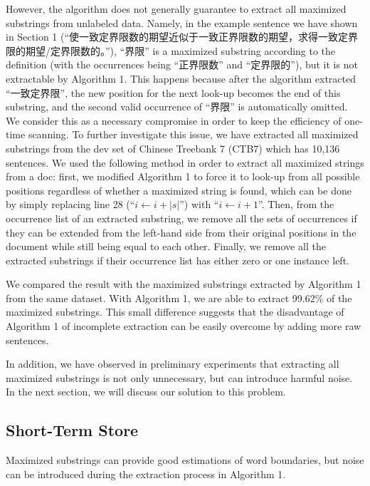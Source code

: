 \documentclass[english]{jnlp_1.4}
\begin{document}
However, the algorithm does not generally guarantee to extract all maximized substrings from unlabeled data. Namely, in the example sentence we have shown in Section 1 (``使一致定界限数的期望近似于一致正界限数的期望，求得一致定界限的期望/定界限数的。''), \mbox{``界}限'' is a maximized substring according to the definition (with the occurrences being ``正界限数'' and ``定界限的''), but it is not extractable by Algorithm 1. This happens because after the algorithm extracted ``一致定界限'', the new position for the next look-up becomes the end of this substring, and the second valid occurrence of ``界限'' is automatically omitted. We consider this as a necessary compromise in order to keep the efficiency of one-time scanning. To further investigate this issue, we have extracted all maximized substrings from the dev set of Chinese Treebank 7 (CTB7) which has 10,136 sentences. We used the following method in order to extract all maximized strings from a doc: first, we modified Algorithm 1 to force it to look-up from all possible positions regardless of whether a maximized string is found, which can be done by simply replacing line 28 (``$i \gets i+|s|$'') with ``$i \gets i+1$''. Then, from the occurrence list of an extracted substring, we remove all the sets of occurrences if they can be extended from the left-hand side from their original positions in the document while still being equal to each other. Finally, we remove all the extracted substrings if their occurrence list has either zero or one instance left.

We compared the result with the maximized substrings extracted by Algorithm 1 from the same dataset. With Algorithm 1, we are able to extract 99.62\% of the maximized substrings. This small difference suggests that the disadvantage of Algorithm 1 of incomplete extraction can be easily overcome by adding more raw sentences. 

In addition, we have observed in preliminary experiments that extracting all maximized substrings is not only unnecessary, but can introduce harmful noise. In the next section, we will discuss our solution to this problem.


\subsection{Short-Term Store}

Maximized substrings can provide good estimations of word boundaries, but noise can be introduced during the extraction process in Algorithm 1. 
\end{document}
